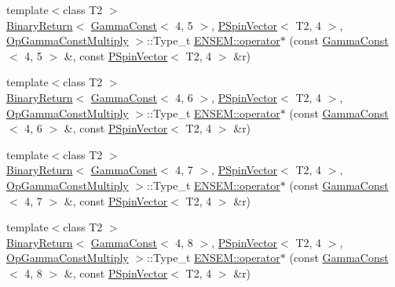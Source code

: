 \begin{DoxyCompactItemize}
\item 
{\footnotesize template$<$class T2 $>$ }\\\mbox{\hyperlink{structENSEM_1_1BinaryReturn}{Binary\+Return}}$<$ \mbox{\hyperlink{classENSEM_1_1GammaConst}{Gamma\+Const}}$<$ 4, 5 $>$, \mbox{\hyperlink{classENSEM_1_1PSpinVector}{P\+Spin\+Vector}}$<$ T2, 4 $>$, \mbox{\hyperlink{structENSEM_1_1OpGammaConstMultiply}{Op\+Gamma\+Const\+Multiply}} $>$\+::Type\+\_\+t \mbox{\hyperlink{group__primspinvector_ga173eb3594c9d1774c080d3df7116efbd}{E\+N\+S\+E\+M\+::operator$\ast$}} (const \mbox{\hyperlink{classENSEM_1_1GammaConst}{Gamma\+Const}}$<$ 4, 5 $>$ \&, const \mbox{\hyperlink{classENSEM_1_1PSpinVector}{P\+Spin\+Vector}}$<$ T2, 4 $>$ \&r)
\item 
{\footnotesize template$<$class T2 $>$ }\\\mbox{\hyperlink{structENSEM_1_1BinaryReturn}{Binary\+Return}}$<$ \mbox{\hyperlink{classENSEM_1_1GammaConst}{Gamma\+Const}}$<$ 4, 6 $>$, \mbox{\hyperlink{classENSEM_1_1PSpinVector}{P\+Spin\+Vector}}$<$ T2, 4 $>$, \mbox{\hyperlink{structENSEM_1_1OpGammaConstMultiply}{Op\+Gamma\+Const\+Multiply}} $>$\+::Type\+\_\+t \mbox{\hyperlink{group__primspinvector_gad9a09b9039ac73a95c0893a4bfd306c2}{E\+N\+S\+E\+M\+::operator$\ast$}} (const \mbox{\hyperlink{classENSEM_1_1GammaConst}{Gamma\+Const}}$<$ 4, 6 $>$ \&, const \mbox{\hyperlink{classENSEM_1_1PSpinVector}{P\+Spin\+Vector}}$<$ T2, 4 $>$ \&r)
\item 
{\footnotesize template$<$class T2 $>$ }\\\mbox{\hyperlink{structENSEM_1_1BinaryReturn}{Binary\+Return}}$<$ \mbox{\hyperlink{classENSEM_1_1GammaConst}{Gamma\+Const}}$<$ 4, 7 $>$, \mbox{\hyperlink{classENSEM_1_1PSpinVector}{P\+Spin\+Vector}}$<$ T2, 4 $>$, \mbox{\hyperlink{structENSEM_1_1OpGammaConstMultiply}{Op\+Gamma\+Const\+Multiply}} $>$\+::Type\+\_\+t \mbox{\hyperlink{group__primspinvector_ga155a168cc76a655423d76a2ad99776a1}{E\+N\+S\+E\+M\+::operator$\ast$}} (const \mbox{\hyperlink{classENSEM_1_1GammaConst}{Gamma\+Const}}$<$ 4, 7 $>$ \&, const \mbox{\hyperlink{classENSEM_1_1PSpinVector}{P\+Spin\+Vector}}$<$ T2, 4 $>$ \&r)
\item 
{\footnotesize template$<$class T2 $>$ }\\\mbox{\hyperlink{structENSEM_1_1BinaryReturn}{Binary\+Return}}$<$ \mbox{\hyperlink{classENSEM_1_1GammaConst}{Gamma\+Const}}$<$ 4, 8 $>$, \mbox{\hyperlink{classENSEM_1_1PSpinVector}{P\+Spin\+Vector}}$<$ T2, 4 $>$, \mbox{\hyperlink{structENSEM_1_1OpGammaConstMultiply}{Op\+Gamma\+Const\+Multiply}} $>$\+::Type\+\_\+t \mbox{\hyperlink{group__primspinvector_gadf1f85c537d85cf1fb2e4dbc24de9d81}{E\+N\+S\+E\+M\+::operator$\ast$}} (const \mbox{\hyperlink{classENSEM_1_1GammaConst}{Gamma\+Const}}$<$ 4, 8 $>$ \&, const \mbox{\hyperlink{classENSEM_1_1PSpinVector}{P\+Spin\+Vector}}$<$ T2, 4 $>$ \&r)

\end{DoxyCompactItemize}
